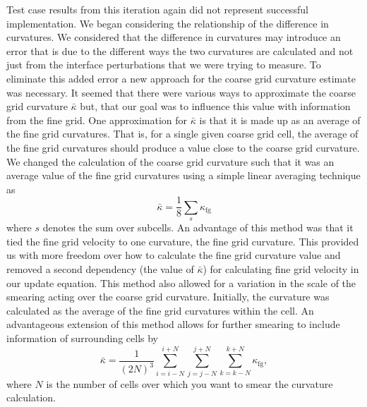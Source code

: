 Test case results from this iteration again did not represent successful implementation. We began considering the relationship of the difference in curvatures. We considered that the difference in curvatures may introduce an error that is due to the different ways the two curvatures are calculated and not just from the interface perturbations that we were trying to measure. To eliminate this added error a new approach for the coarse grid curvature estimate was necessary. It seemed that there were various ways to approximate the coarse grid curvature $\bar{\kappa}$ but, that our goal was to influence this value with information from the fine grid. One approximation for $\bar{\kappa}$ is that it is made up as an average of the fine grid curvatures. That is, for a single given coarse grid cell, the average of the fine grid curvatures should produce a value close to the coarse grid curvature. We changed the calculation of the coarse grid curvature such that it was an average value of the fine grid curvatures using a simple linear averaging technique as 
\begin{equation}
\bar{\kappa} = \frac{1}{8} \sum_{s} \kappa_{\text{fg}} 
\end{equation} where $s$ denotes the sum over subcells. An advantage of this method was that it tied the fine grid velocity to one curvature, the fine grid curvature. This provided us with more freedom over how to calculate the fine grid curvature value and removed a second dependency (the value of $\bar{\kappa}$) for calculating fine grid velocity in our update equation. This method also allowed for a variation in the scale of the smearing acting over the coarse grid curvature. Initially, the curvature was calculated as the average of the fine grid curvatures within the cell. An advantageous extension of this method  allows for further smearing to include information of surrounding cells by
 \begin{equation}
 \bar{\kappa} = \frac{1}{(2N)^3}\sum_{i=i-N}^{i+N}\sum_{j=j-N}^{j+N} \sum_{k=k-N}^{k+N} \kappa_{\text{fg}} ,
 \end{equation}
 where $N$ is the number of cells over which you want to smear the curvature calculation.
 
